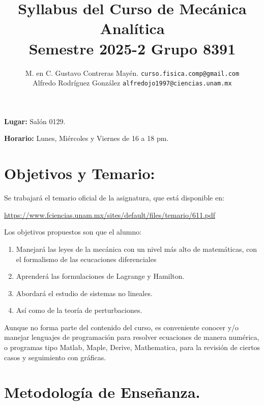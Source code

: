 \documentclass[hidelinks,12pt]{article}
\author{M. en C. Gustavo Contreras Mayén. \texttt{curso.fisica.comp@gmail.com}\\
Alfredo Rodríguez González \texttt{alfredojo1997@ciencias.unam.mx}}
\title{Syllabus del Curso de Mecánica Analítica \\ {\large Semestre 2025-2 Grupo 8391}}
\date{ }
\renewcommand\labelenumii{\theenumi.{\arabic{enumii}})}
\begin{document}
\renewcommand\labelenumii{\theenumi.{\arabic{enumii}}}
\maketitle
\fontsize{12}{12}\selectfont

\textbf{Lugar: } Salón 0129.
\par
\textbf{Horario: } Lunes, Miércoles y Viernes de 16 a 18 pm.
\par
\par
\section{Objetivos y Temario:}

Se trabajará el temario oficial de la asignatura, que está disponible en:

\href{https://www.fciencias.unam.mx/sites/default/files/temario/611.pdf}{https://www.fciencias.unam.mx/sites/default/files/temario/611.pdf}

Los objetivos propuestos son que el alumno:
\begin{enumerate}
    \item Manejará las leyes de la mecánica con un nivel más alto de matemáticas, con el formalismo de las ecucaciones diferenciales
    \item Aprenderá las formulaciones de Lagrange y Hamilton.
    \item Abordará el estudio de sistemas no lineales.
    \item Así como de la teoría de perturbaciones.
\end{enumerate}
Aunque no forma parte del contenido del curso, es conveniente conocer y/o manejar lenguajes de programación para resolver ecuaciones de manera numérica, o programas tipo Matlab, Maple, Derive, Mathematica, para la revisión de ciertos casos y seguimiento con gráficas.

\newpage

\section{Metodología de Enseñanza.}
\end{document}
